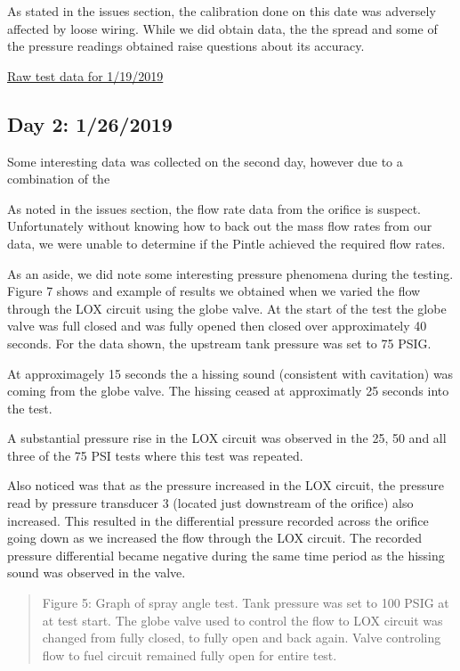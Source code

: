 \documentclass[11pt]{article}
\begin{document}
As stated in the issues section, the calibration done on this date was
adversely affected by loose wiring. While we did obtain data, the the
spread and some of the pressure readings obtained raise questions about
its accuracy.

\href{https://github.com/psas/liquid-engine-test-stand/tree/master/analysis/Pintle_V1\%20testing/Pintle\%20Test\%2001-19-2019}{Raw
test data for 1/19/2019}

\subsection{Day 2: 1/26/2019}\label{day-2-1262019}

Some interesting data was collected on the second day, however due to a
combination of the

As noted in the issues section, the flow rate data from the orifice is
suspect. Unfortunately without knowing how to back out the mass flow
rates from our data, we were unable to determine if the Pintle achieved
the required flow rates.

As an aside, we did note some interesting pressure phenomena during the
testing. Figure 7 shows and example of results we obtained when we
varied the flow through the LOX circuit using the globe valve. At the
start of the test the globe valve was full closed and was fully opened
then closed over approximately 40 seconds. For the data shown, the
upstream tank pressure was set to 75 PSIG.

At approximagely 15 seconds the a hissing sound (consistent with
cavitation) was coming from the globe valve. The hissing ceased at
approximatly 25 seconds into the test.

A substantial pressure rise in the LOX circuit was observed in the 25,
50 and all three of the 75 PSI tests where this test was repeated.

Also noticed was that as the pressure increased in the LOX circuit, the
pressure read by pressure transducer 3 (located just downstream of the
orifice) also increased. This resulted in the differential pressure
recorded across the orifice going down as we increased the flow through
the LOX circuit. The recorded pressure differential became negative
during the same time period as the hissing sound was observed in the
valve.

\begin{quote}
Figure 5: Graph of spray angle test. Tank pressure was set to 100 PSIG
at at test start. The globe valve used to control the flow to LOX
circuit was changed from fully closed, to fully open and back again.
Valve controling flow to fuel circuit remained fully open for entire
test.
\end{quote}
\end{document}
